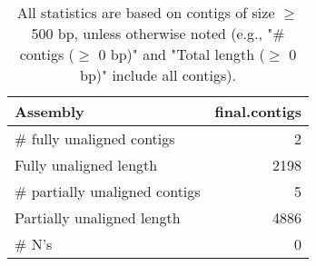 \documentclass[12pt,a4paper]{article}
\begin{document}
\begin{table}[ht]
\begin{center}
\caption{All statistics are based on contigs of size $\geq$ 500 bp, unless otherwise noted (e.g., "\# contigs ($\geq$ 0 bp)" and "Total length ($\geq$ 0 bp)" include all contigs).}
\begin{tabular}{|l*{1}{|r}|}
\hline
Assembly & final.contigs \\ \hline
\# fully unaligned contigs & 2 \\ \hline
Fully unaligned length & 2198 \\ \hline
\# partially unaligned contigs & 5 \\ \hline
Partially unaligned length & 4886 \\ \hline
\# N's & 0 \\ \hline
\end{tabular}
\end{center}
\end{table}
\end{document}
